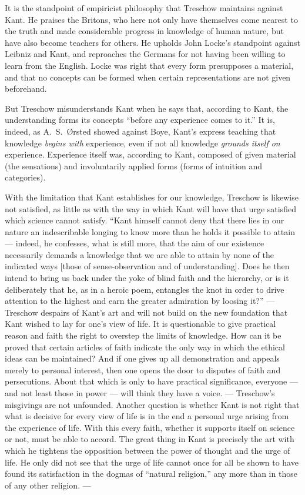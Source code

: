 \documentclass[12pt,a4paper]{book}
\newcommand{\opage}[1]{\marginnote{\footnotesize\textit{[#1]}}}
\begin{document}
It is the standpoint of empiricist philosophy that Treschow maintains against Kant.
He praises the Britons, who here not only have themselves come nearest to the truth
and made considerable progress in knowledge of human nature, but have also become
teachers for others. He upholds John Locke's standpoint against Leibniz and Kant,
and reproaches the Germans for not having been willing to learn from the English.
Locke was right that every form presupposes a material, and that no concepts can be
formed when certain representations are not given beforehand.

But Treschow misunderstands Kant when he says that, according to Kant, the
understanding forms its concepts ``before any experience comes to it.'' It is,
indeed, as A.\ S.\ Ørsted showed against Boye, Kant's express teaching that
knowledge \emph{begins with} experience, even if not all knowledge \emph{grounds
itself on} experience. Experience itself was, according to Kant, composed of given
material (the sensations) and involuntarily applied forms (forms of intuition and
categories).

With the limitation that Kant establishes for our knowledge, Treschow is likewise
not satisfied, as little as with the way in which Kant will have that urge satisfied
which science cannot satisfy. ``Kant himself cannot deny that there lies in our
nature an indescribable longing to know more than he holds it possible to attain ---
indeed, he confesses, what is still more, that the aim of our existence necessarily
demands a knowledge that we are able to attain by none of the indicated ways [those
of sense-observation and of understanding]. Does he then intend to bring us back
under the yoke of blind faith and the hierarchy, or is it deliberately that he, \opage{39}as
in a heroic poem, entangles the knot in order to drive attention to the highest and
earn the greater admiration by loosing it?'' --- Treschow despairs of Kant's art and
will not build on the new foundation that Kant wished to lay for one's view of life.
It is questionable to give practical reason and faith the right to overstep the
limits of knowledge. How can it be proved that certain articles of faith indicate
the only way in which the ethical ideas can be maintained? And if one gives up all
demonstration and appeals merely to personal interest, then one opens the door to
disputes of faith and persecutions. About that which is only to have practical
significance, everyone --- and not least those in power --- will think they have a
voice. --- Treschow's misgivings are not unfounded. Another question is whether Kant
is not right that what is decisive for every view of life is in the end a personal
urge arising from the experience of life. With this every faith, whether it supports
itself on science or not, must be able to accord. The great thing in Kant is
precisely the art with which he tightens the opposition between the power of thought
and the urge of life. He only did not see that the urge of life cannot once for all
be shown to have found its satisfaction in the dogmas of ``natural religion,'' any
more than in those of any other religion. ---
\end{document}
